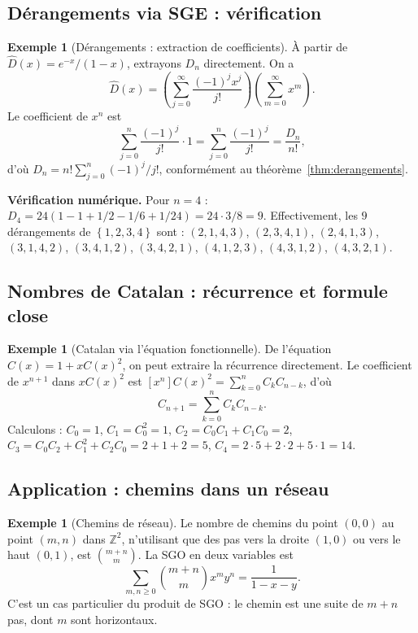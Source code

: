 \documentclass[12pt,a4paper,openany]{book}
\theoremstyle{definition}
\newtheorem{exemple}[definition]{Exemple}
\theoremstyle{plain}
\theoremstyle{remark}
\newcommand{\Z}{\mathbb{Z}}
\newcommand{\set}[1]{\left\{#1\right\}}
\begin{document}
\subsection{Dérangements via SGE : vérification}
\label{sec:derangements-egf-verif}

\begin{exemple}[Dérangements : extraction de coefficients]
\label{ex:derangements-egf}
À partir de $\hat{D}(x) = e^{-x}/(1-x)$, extrayons $D_n$ directement.
On a
\[
  \hat{D}(x) = \left(\sum_{j=0}^{\infty} \frac{(-1)^j x^j}{j!}\right)
    \left(\sum_{m=0}^{\infty} x^m\right).
\]
Le coefficient de $x^n$ est
\[
  \sum_{j=0}^{n} \frac{(-1)^j}{j!} \cdot 1 = \sum_{j=0}^{n} \frac{(-1)^j}{j!} = \frac{D_n}{n!},
\]
d'où $D_n = n! \sum_{j=0}^n (-1)^j / j!$, conformément au théorème~\ref{thm:derangements}.

\medskip
\noindent\textbf{Vérification numérique.}
Pour $n = 4$ : $D_4 = 24(1 - 1 + 1/2 - 1/6 + 1/24) = 24 \cdot 3/8 = 9$.
Effectivement, les $9$ dérangements de $\set{1,2,3,4}$ sont :
$(2,1,4,3)$, $(2,3,4,1)$, $(2,4,1,3)$, $(3,1,4,2)$, $(3,4,1,2)$,
$(3,4,2,1)$, $(4,1,2,3)$, $(4,3,1,2)$, $(4,3,2,1)$.
\end{exemple}

\subsection{Nombres de Catalan : récurrence et formule close}

\begin{exemple}[Catalan via l'équation fonctionnelle]
\label{ex:catalan-rec}
De l'équation $C(x) = 1 + xC(x)^2$, on peut extraire la récurrence
directement. Le coefficient de $x^{n+1}$ dans $xC(x)^2$ est
$[x^n]C(x)^2 = \sum_{k=0}^n C_k C_{n-k}$, d'où
\[
  C_{n+1} = \sum_{k=0}^{n} C_k C_{n-k}.
\]
Calculons : $C_0 = 1$, $C_1 = C_0^2 = 1$, $C_2 = C_0 C_1 + C_1 C_0 = 2$,
$C_3 = C_0 C_2 + C_1^2 + C_2 C_0 = 2 + 1 + 2 = 5$, $C_4 = 2 \cdot 5 + 2 \cdot 2 + 5 \cdot 1 = 14$.
\end{exemple}

\subsection{Application : chemins dans un réseau}

\begin{exemple}[Chemins de réseau]
\label{ex:chemins-reseau}
Le nombre de chemins du point $(0,0)$ au point $(m,n)$ dans $\Z^2$,
n'utilisant que des pas vers la droite $(1,0)$ ou vers le haut $(0,1)$,
est $\binom{m+n}{m}$. La SGO en deux variables est
\[
  \sum_{m,n \geqslant 0} \binom{m+n}{m} x^m y^n = \frac{1}{1-x-y}.
\]
C'est un cas particulier du produit de SGO : le chemin est une suite de
$m+n$ pas, dont $m$ sont horizontaux.
\end{exemple}
\end{document}
